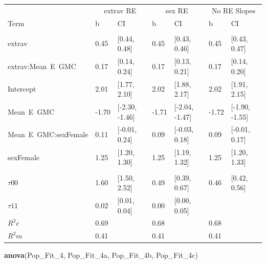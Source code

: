\documentclass[]{article}
\newenvironment{Shaded}{\begin{snugshade}}{\end{snugshade}}
\newcommand{\KeywordTok}[1]{\textcolor[rgb]{0.13,0.29,0.53}{\textbf{#1}}}
\newcommand{\DecValTok}[1]{\textcolor[rgb]{0.00,0.00,0.81}{#1}}
\newcommand{\NormalTok}[1]{#1}
\begin{document}
\begin{tabular}{lllllll}
\toprule
\multicolumn{1}{c}{ } & \multicolumn{2}{c}{extrav RE} & \multicolumn{2}{c}{sex RE} & \multicolumn{2}{c}{No RE Slopes} \\
\cmidrule(l{2pt}r{2pt}){2-3} \cmidrule(l{2pt}r{2pt}){4-5} \cmidrule(l{2pt}r{2pt}){6-7}
Term & b & CI & b & CI & b & CI\\
\midrule
\addlinespace[0.3em]
\multicolumn{7}{l}{\textbf{Fixed}}\\
\hspace{1em}extrav & 0.45 & [0.44, 0.48] & 0.45 & [0.43, 0.46] & 0.45 & [0.43, 0.47]\\
\hspace{1em}extrav:Mean\ E\ GMC & 0.17 & [0.14, 0.24] & 0.17 & [0.13, 0.21] & 0.17 & [0.14, 0.20]\\
\hspace{1em}Intercept & 2.01 & [1.77, 2.10] & 2.02 & [1.88, 2.17] & 2.02 & [1.91, 2.15]\\
\hspace{1em}Mean\ E\ GMC & -1.70 & [-2.30, -1.46] & -1.71 & [-2.04, -1.47] & -1.72 & [-1.90, -1.55]\\
\hspace{1em}Mean\ E\ GMC:sexFemale & 0.11 & [-0.01, 0.24] & 0.09 & [-0.03, 0.18] & 0.09 & [-0.01, 0.17]\\
\hspace{1em}sexFemale & 1.25 & [1.20, 1.30] & 1.25 & [1.19, 1.32] & 1.25 & [1.20, 1.33]\\
\addlinespace[0.3em]
\multicolumn{7}{l}{\textbf{Random}}\\
\hspace{1em}$\tau {00}$ & 1.60 & [1.50, 2.52] & 0.49 & [0.39, 0.67] & 0.46 & [0.42, 0.56]\\
\hspace{1em}$\tau {11}$ & 0.02 & [0.01, 0.04] & 0.00 & [0.00, 0.05] &  & \\
$R^2 c$ & 0.69 &  & 0.68 &  & 0.68 & \\
$R^2 m$ & 0.41 &  & 0.41 &  & 0.41 & \\
\bottomrule
\end{tabular}

\begin{Shaded}
\begin{Highlighting}[]
\KeywordTok{anova}\NormalTok{(Pop_Fit_}\DecValTok{4}\NormalTok{, Pop_Fit_4a, Pop_Fit_4b, Pop_Fit_4c)}
\end{Highlighting}
\end{Shaded}
\end{document}
